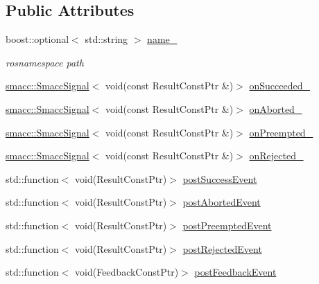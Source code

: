 \subsection*{Public Attributes}
\begin{DoxyCompactItemize}
\item 
boost\+::optional$<$ std\+::string $>$ \hyperlink{classsmacc_1_1SmaccActionClientBase_a8464e3ec514e57333339fc538a2203f4}{name\+\_\+}
\begin{DoxyCompactList}\small\item\em rosnamespace path \end{DoxyCompactList}\item 
\hyperlink{classsmacc_1_1SmaccSignal}{smacc\+::\+Smacc\+Signal}$<$ void(const Result\+Const\+Ptr \&)$>$ \hyperlink{classsmacc_1_1SmaccActionClientBase_aca976e0c55e96165fdc0eb6df7919d58}{on\+Succeeded\+\_\+}
\item 
\hyperlink{classsmacc_1_1SmaccSignal}{smacc\+::\+Smacc\+Signal}$<$ void(const Result\+Const\+Ptr \&)$>$ \hyperlink{classsmacc_1_1SmaccActionClientBase_a45a892b990b8d61e4f2f5b34181bf16d}{on\+Aborted\+\_\+}
\item 
\hyperlink{classsmacc_1_1SmaccSignal}{smacc\+::\+Smacc\+Signal}$<$ void(const Result\+Const\+Ptr \&)$>$ \hyperlink{classsmacc_1_1SmaccActionClientBase_abfa809d36c04d3b8d735527867635b1d}{on\+Preempted\+\_\+}
\item 
\hyperlink{classsmacc_1_1SmaccSignal}{smacc\+::\+Smacc\+Signal}$<$ void(const Result\+Const\+Ptr \&)$>$ \hyperlink{classsmacc_1_1SmaccActionClientBase_a5c45413657d82e9505537df51b764c41}{on\+Rejected\+\_\+}
\item 
std\+::function$<$ void(Result\+Const\+Ptr)$>$ \hyperlink{classsmacc_1_1SmaccActionClientBase_afa4343d33f5c10b54a98c875b5a37b04}{post\+Success\+Event}
\item 
std\+::function$<$ void(Result\+Const\+Ptr)$>$ \hyperlink{classsmacc_1_1SmaccActionClientBase_ae0ec1c3fcea9712b35bc09686687c251}{post\+Aborted\+Event}
\item 
std\+::function$<$ void(Result\+Const\+Ptr)$>$ \hyperlink{classsmacc_1_1SmaccActionClientBase_ab573e9d9fecf76e8154fc170615e88cb}{post\+Preempted\+Event}
\item 
std\+::function$<$ void(Result\+Const\+Ptr)$>$ \hyperlink{classsmacc_1_1SmaccActionClientBase_ac6e3851af2c76823d41219efbf2df480}{post\+Rejected\+Event}
\item 
std\+::function$<$ void(Feedback\+Const\+Ptr)$>$ \hyperlink{classsmacc_1_1SmaccActionClientBase_a00b28b8a2ea8bddbbbf3e0a1d80b20a1}{post\+Feedback\+Event}

\end{DoxyCompactItemize}
